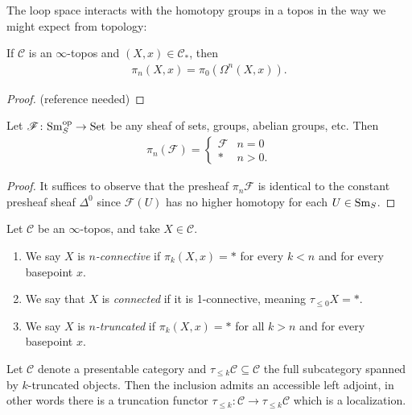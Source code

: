 \documentclass[11pt,openany]{book}
\begin{document}
The loop space interacts with the homotopy groups in a topos in the way we might expect from topology:

\begin{proposition}\label{prop:pi-n-loops} 
If $\mathscr{C}$ is an $\infty$-topos and $(X,x) \in \mathscr{C}_\ast$, then
\begin{align*}
    \pi_n(X,x) = \pi_0 (\Omega^n (X,x)).
\end{align*}
\end{proposition}
\begin{proof} (reference needed)
\end{proof}




\begin{example} Let $\mathscr{F} \colon \mathrm{Sm}_S^{\mathrm{op}} \to \mathrm{Set}$ be any sheaf of sets, groups, abelian groups, etc. Then
\begin{align*}
    \pi_n(\mathscr{F}) = \begin{cases} \mathscr{F} & n=0 \\ \ast & n>0. \end{cases}
\end{align*}
\end{example}
\begin{proof} It suffices to observe that the presheaf $\pi_n \mathscr{F}$ is identical to the constant presheaf sheaf $\Delta^0$ since $\mathscr{F}(U)$ has no higher homotopy for each $U \in \mathrm{Sm}_S$.
\end{proof}


\begin{definition} \cite[6.5.1.10]{HTT} Let $\mathscr{C}$ be an $\infty$-topos, and take $X\in \mathscr{C}$.
\begin{enumerate}
    \item We say $X$ is $n$\textit{-connective} if $\pi_k(X,x) = \ast$ for every $k<n$ and for every basepoint $x$.

    \item We say that $X$ is \textit{connected} if it is 1-connective, meaning $\tau_{\le 0} X = \ast$.
    \item We say $X$ is $n$\textit{-truncated} if $\pi_k(X,x) = \ast$ for all $k>n$ and for every basepoint $x$.
\end{enumerate}
\end{definition}

\begin{proposition} \cite[5.5.6.18]{HTT}
Let $\mathscr{C}$ denote a presentable category and $\tau_{\le k} \mathscr{C} \subseteq \mathscr{C}$ the full subcategory spanned by $k$-truncated objects. Then the inclusion admits an accessible left adjoint, in other words there is a truncation functor $\tau_{\le k} : \mathscr{C} \to \tau_{\leq k} \mathscr{C}$ which is a localization.
\end{proposition}
\end{document}
